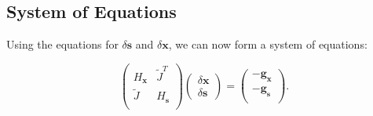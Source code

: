\documentclass[letterpaper,12pt]{article}
\theoremstyle{remark}
\newcommand{\x}{\mathbf{x}}
\newcommand{\s}{\mathbf{s}}
\newcommand{\dx}{\delta \x}
\newcommand{\ds}{\delta \s}
\newcommand{\Hx}{ {H_\x} }
\newcommand{\Hs}{ {H_\s} }
\newcommand{\gx}{ {\mathbf{g}_\x} }
\newcommand{\gs}{ {\mathbf{g}_\s} }
\newcommand{\Jt}{ {\tilde{J}} }
\begin{document}
\subsection{System of Equations}
Using the equations for $\ds$ and $\dx$, we can now form a system of equations:

\begin{equation}
\begin{pmatrix}
\Hx & \Jt^T \\
\Jt & \Hs  \\
\end{pmatrix}
\begin{pmatrix}
\dx \\
\ds
\end{pmatrix} =
\begin{pmatrix}
-\gx \\
-\gs \\
\end{pmatrix}.
\end{equation}


\end{document}
